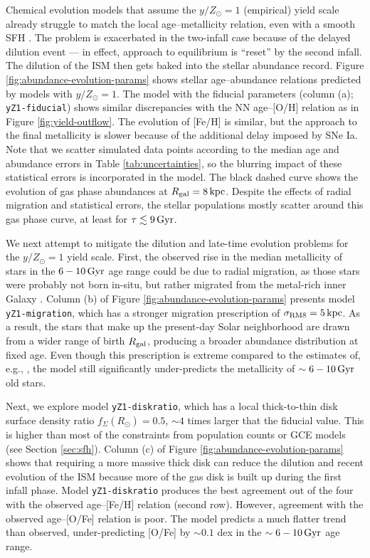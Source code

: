 \documentclass[twocolumn,twocolappendix,linenumbers]{aastex631}
\newcommand{\yZ}[1]{$y/Z_\odot=#1$}
\newcommand{\kpc}{\,{\rm kpc}}
\newcommand{\Gyr}{\,{\rm Gyr}}
\begin{document}
Chemical evolution models that assume the \yZ{1} (empirical) yield scale already struggle to match the local age--metallicity relation, even with a smooth SFH \citep[see also][]{johnson_milky_2024}. The problem is exacerbated in the two-infall case because of the delayed dilution event --- in effect, approach to equilibrium is ``reset'' by the second infall. The dilution of the ISM then gets baked into the stellar abundance record.
Figure \ref{fig:abundance-evolution-params} shows stellar age--abundance relations predicted by models with \yZ{1}. The model with the fiducial parameters (column (a); {\tt yZ1-fiducial}) shows similar discrepancies with the \citet{leung_variational_2023} NN age--[O/H] relation as in Figure \ref{fig:yield-outflow}. The evolution of [Fe/H] is similar, but the approach to the final metallicity is slower because of the additional delay imposed by SNe Ia. Note that we scatter simulated data points according to the median age and abundance errors in Table \ref{tab:uncertainties}, so the blurring impact of these statistical errors is incorporated in the model. The black dashed curve shows the evolution of gas phase abundances at $R_{\rm gal}=8\kpc$. Despite the effects of radial migration and statistical errors, the stellar populations mostly scatter around this gas phase curve, at least for $\tau\lesssim9\Gyr$.

We next attempt to mitigate the dilution and late-time evolution problems for the \yZ{1} yield scale. First, the observed rise in the median metallicity of stars in the $6-10\Gyr$ age range could be due to radial migration, as those stars were probably not born in-situ, but rather migrated from the metal-rich inner Galaxy \citep{feuillet_age-resolved_2018}. Column (b) of Figure \ref{fig:abundance-evolution-params} presents model {\tt yZ1-migration}, which has a stronger migration prescription of $\sigma_{\rm RM8}=5\kpc$. As a result, the stars that make up the present-day Solar neighborhood are drawn from a wider range of birth $R_{\rm gal}$, producing a broader abundance distribution at fixed age. Even though this prescription is extreme compared to the estimates of, e.g., \citet{frankel_measuring_2018}, the model still significantly under-predicts the metallicity of $\sim6-10\,{\rm Gyr}$ old stars.

Next, we explore model {\tt yZ1-diskratio}, which has a local thick-to-thin disk surface density ratio $f_\Sigma(R_\odot)=0.5$, $\sim4$ times larger that the fiducial value. This is higher than most of the constraints from population counts or GCE models (see Section \ref{sec:sfh}). Column (c) of Figure \ref{fig:abundance-evolution-params} shows that requiring a more massive thick disk can reduce the dilution and recent evolution of the ISM because more of the gas disk is built up during the first infall phase. Model {\tt yZ1-diskratio} produces the best agreement out of the four with the observed age--[Fe/H] relation (second row). However, agreement with the observed age--[O/Fe] relation is poor. The model predicts a much flatter trend than observed, under-predicting [O/Fe] by $\sim0.1$ dex in the $\sim6-10\Gyr$ age range.
\end{document}
